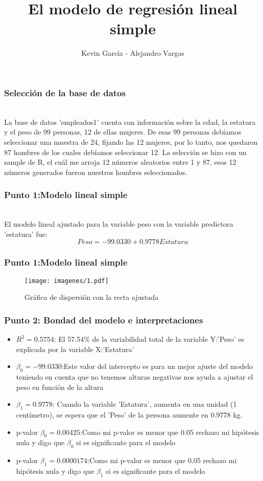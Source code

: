 \documentclass[12pt]{beamer}
\author{Kevin García - Alejandro Vargas}
\title{El modelo de regresión lineal simple}
\begin{document}
\begin{frame}
\titlepage
\end{frame}

\begin{frame}
\frametitle{Selección de la base de datos}
~\\La base de datos 'empleados1' cuenta con información sobre la edad, la estatura y el peso
de 99 personas, 12 de ellas mujeres. De esas 99 personas debíamos seleccionar una muestra de 24, fijando las 12 mujeres, por lo tanto, nos quedaron 87 hombres de los cuales debíamos seleccionar 12. La selección se hizo con un sample de R, el cuál me arroja 12 números aleatorios entre 1 y 87, esos 12 números generados fueron nuestros hombres seleccionados.
\end{frame}

\begin{frame}
\frametitle{Punto 1:Modelo lineal simple}
~\\ El modelo lineal ajustado para la variable peso con la variable predictora 'estatura' fue:
~\\ $$Peso=-99.0330+0.9778 Estatura$$
\end{frame}
\begin{frame}
\frametitle{Punto 1:Modelo lineal simple}
\begin{figure}[!h]
    \begin{center}
        \texttt{[image: imagenes/1.pdf]}
        \caption{Gráfica de dispersión con la recta ajustada}
        \label{fig:Densidad}
    \end{center}
\end{figure}
\end{frame}

\begin{frame}
\frametitle{Punto 2: Bondad del modelo e interpretaciones}
\begin{itemize}
\item $R^2=0.5754$: El 57.54\% de la variabilidad total de la variable Y:'Peso' es explicada por la variable X:'Estatura'
\item $\beta_{0}=-99.0330$:Este valor del intercepto es para un mejor ajuste del modelo teniendo en cuenta que no tenemos alturas negativas nos ayuda a ajustar el peso en función de la altura
\item $\beta_{1}=0.9778$: Cuando la variable 'Estatura', aumenta en una unidad (1 centímetro), se espera que el 'Peso' de la persona aumente en 0.9778 kg.
\item p-valor $\beta_{0}=0.00425$:Como mi p-valor es menor que 0.05 rechazo mi hipótesis nula y digo que $\beta_{0}$ si es significante para el modelo 
\item p-valor $\beta_{1}=0.0000174$:Como mi p-valor es menor que 0.05 rechazo mi hipótesis nula y digo que $\beta_{1}$ si es significante para el modelo
\end{itemize}
\end{frame}
\end{document}
